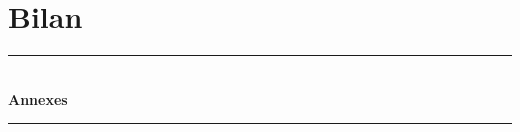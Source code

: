 \documentclass[a4paper,12pt]{report}
\begin{document}
\chapter*{Bilan}






\listoffigures
\newpage
\appendix
{}
{}

\vspace*{8cm}
\begin{center}
\rule{\linewidth}{0.5mm}\\[0.7cm]
{\huge{\bfseries Annexes}}\\[0.4cm]
\rule{\linewidth}{0.5mm}\\[0.5cm]


\end{center}
%

\newpage
%
\end{document}

